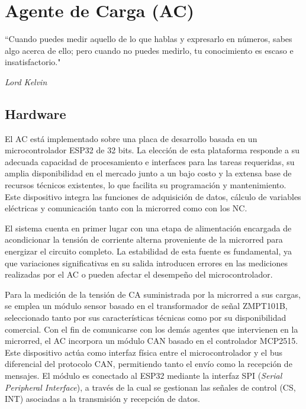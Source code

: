 \cleardoublepage                                   
\chapter{Agente de Carga (AC)}
\epigraph{``Cuando puedes medir aquello de lo que hablas y expresarlo en
números, sabes algo acerca de ello; pero cuando no puedes medirlo, tu
conocimiento es escaso e insatisfactorio."}{\textit{Lord Kelvin}}
\section{Hardware}

El AC está implementado sobre una placa de desarrollo basada en un microcontrolador ESP32 de 32 bits. La elección de esta plataforma responde a su adecuada capacidad de procesamiento e interfaces para las tareas requeridas, su amplia disponibilidad en el mercado junto a un bajo costo y la extensa base de recursos técnicos existentes, lo que facilita su programación y mantenimiento. Este dispositivo integra las funciones de adquisición de datos, cálculo de variables eléctricas y comunicación tanto con la microrred como con los NC.

El sistema cuenta en primer lugar con una etapa de alimentación encargada de acondicionar la tensión de corriente alterna proveniente de la microrred para energizar el circuito completo. La estabilidad de esta fuente es fundamental, ya que variaciones significativas en su salida introducen errores en las mediciones realizadas por el AC o pueden afectar el desempeño del microcontrolador.

Para la medición de la tensión de CA suministrada por la microrred a sus cargas, se emplea un módulo sensor basado en el transformador de señal ZMPT101B, seleccionado tanto por sus características técnicas como por su disponibilidad comercial.  Con el fin de comunicarse con los demás agentes que intervienen en la microrred, el AC incorpora un módulo CAN basado en el controlador MCP2515. Este dispositivo actúa como interfaz física entre el microcontrolador y el bus diferencial del protocolo CAN, permitiendo tanto el envío como la recepción de mensajes. El módulo es conectado al ESP32 mediante la interfaz SPI (\textit{Serial Peripheral Interface}), a través de la cual se gestionan las señales de control (CS, INT) asociadas a la transmisión y recepción de datos.

